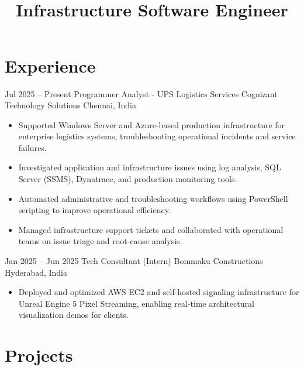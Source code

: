 \documentclass[10pt, a4paper, sans]{moderncv}
\title{\\[2mm] Infrastructure Software Engineer} %
\begin{document}

\makecvtitle
\vspace*{-8mm}

\section{Experience}

\cventry
  {Jul 2025 -- Present}
  {Programmer Analyst - UPS Logistics Services}
  {Cognizant Technology Solutions}
  {Chennai, India}
  {}
  {
  \begin{itemize}\setlength{\itemsep}{2pt}
    \item Supported Windows Server and Azure-based production infrastructure for enterprise logistics systems, troubleshooting operational incidents and service failures.
    \item Investigated application and infrastructure issues using log analysis, SQL Server (SSMS), Dynatrace, and production monitoring tools.
    \item Automated administrative and troubleshooting workflows using PowerShell scripting to improve operational efficiency.
    \item Managed infrastructure support tickets and collaborated with operational teams on issue triage and root-cause analysis.
  \end{itemize}
  }

\vspace{1mm}

\cventry
  {Jan 2025 -- Jun 2025}
  {Tech Consultant (Intern)}
  {Bommaku Constructions}
  {Hyderabad, India}
  {}
  {
  \begin{itemize}\setlength{\itemsep}{2pt}
    \item Deployed and optimized AWS EC2 and self-hosted signaling infrastructure for Unreal Engine 5 Pixel Streaming, enabling real-time architectural visualization demos for clients.
  \end{itemize}
  }

\section{Projects}
\end{document}
